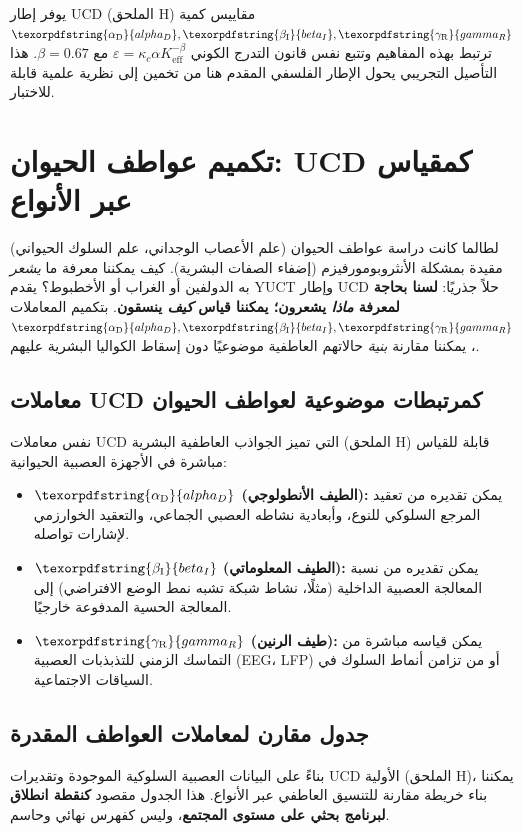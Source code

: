 \documentclass[12pt,a4paper]{article}
\DeclareRobustCommand{\alD}{\texorpdfstring{\ensuremath{\alpha_{\mathrm{D}}}}{alpha_D}}
\DeclareRobustCommand{\beI}{\texorpdfstring{\ensuremath{\beta_{\mathrm{I}}}}{beta_I}}
\DeclareRobustCommand{\gaR}{\texorpdfstring{\ensuremath{\gamma_{\mathrm{R}}}}{gamma_R}}
\newcommand{\eff}{\mathrm{eff}}
\newcommand{\Ke}{K_{\eff}}
\begin{document}
	يوفر إطار UCD (الملحق H) مقاييس كمية \(\alD, \beI, \gaR\) ترتبط بهذه المفاهيم وتتبع نفس قانون التدرج الكوني \(\varepsilon = \kappa_c \alpha \Ke^{-\beta}\) مع \(\beta = 0.67\). هذا التأصيل التجريبي يحول الإطار الفلسفي المقدم هنا من تخمين إلى نظرية علمية قابلة للاختبار.
	
	\section{تكميم عواطف الحيوان: UCD كمقياس عبر الأنواع}
	
	لطالما كانت دراسة عواطف الحيوان (علم الأعصاب الوجداني، علم السلوك الحيواني) مقيدة بمشكلة الأنثروبومورفيزم (إضفاء الصفات البشرية). كيف يمكننا معرفة ما \textit{يشعر} به الدولفين أو الغراب أو الأخطبوط؟ يقدم YUCT وإطار UCD حلاً جذريًا: \textbf{لسنا بحاجة لمعرفة \textit{ماذا} يشعرون؛ يمكننا قياس \textit{كيف} ينسقون}. بتكميم المعاملات \(\alD, \beI, \gaR\)، يمكننا مقارنة \textit{بنية} حالاتهم العاطفية موضوعيًا دون إسقاط الكواليا البشرية عليهم.
	
	\subsection{معاملات UCD كمرتبطات موضوعية لعواطف الحيوان}
	
	نفس معاملات UCD التي تميز الجواذب العاطفية البشرية (الملحق H) قابلة للقياس مباشرة في الأجهزة العصبية الحيوانية:
	
	\begin{itemize}
		\item \textbf{\(\alD\) (الطيف الأنطولوجي):} يمكن تقديره من تعقيد المرجع السلوكي للنوع، وأبعادية نشاطه العصبي الجماعي، والتعقيد الخوارزمي لإشارات تواصله.
		\item \textbf{\(\beI\) (الطيف المعلوماتي):} يمكن تقديره من نسبة المعالجة العصبية الداخلية (مثلًا، نشاط شبكة تشبه نمط الوضع الافتراضي) إلى المعالجة الحسية المدفوعة خارجيًا.
		\item \textbf{\(\gaR\) (طيف الرنين):} يمكن قياسه مباشرة من التماسك الزمني للتذبذبات العصبية (EEG، LFP) أو من تزامن أنماط السلوك في السياقات الاجتماعية.
	\end{itemize}
	
	\subsection{جدول مقارن لمعاملات العواطف المقدرة}
	
	بناءً على البيانات العصبية السلوكية الموجودة وتقديرات UCD الأولية (الملحق H)، يمكننا بناء خريطة مقارنة للتنسيق العاطفي عبر الأنواع. هذا الجدول مقصود \textbf{كنقطة انطلاق لبرنامج بحثي على مستوى المجتمع}، وليس كفهرس نهائي وحاسم.
	
\end{document}
